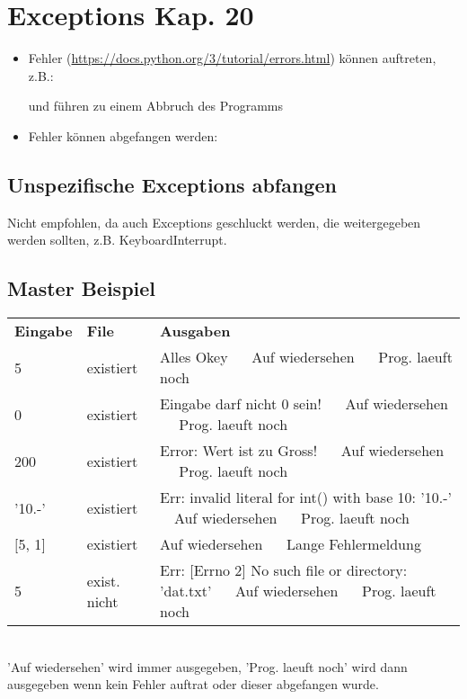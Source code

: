 \section[Exceptions]{Exceptions \tiny{Kap. 20}}
\begin{itemize}
	\item Fehler (\url{https://docs.python.org/3/tutorial/errors.html}) können auftreten, z.B.:
	
	und führen zu einem Abbruch des Programms
	\item Fehler können abgefangen werden:
	
\end{itemize}

\subsection{Unspezifische Exceptions abfangen}
Nicht empfohlen, da auch Exceptions geschluckt werden, die weitergegeben werden sollten, z.B. KeyboardInterrupt.\\


\subsection{Master Beispiel}

\begin{tabular}{lll}
	\textbf{Eingabe} & \textbf{File}  & \textbf{Ausgaben}\\
	5 		& existiert & Alles Okey $ \quad $ Auf wiedersehen $ \quad $ Prog. laeuft noch\\
	0 		& existiert & Eingabe darf nicht 0 sein! $ \quad $ Auf wiedersehen $ \quad $ Prog. laeuft noch\\
	200		& existiert & Error: Wert ist zu Gross! $ \quad $ Auf wiedersehen $ \quad $ Prog. laeuft noch\\
	'10.-' 	& existiert & Err: invalid literal for int() with base 10: '10.-' $ \quad $Auf wiedersehen $ \quad $ Prog. laeuft noch\\
	$[$5, 1$]$ 	& existiert & Auf wiedersehen $ \quad $ Lange Fehlermeldung\\ 
	5		& exist. nicht & Err: [Errno 2] No such file or directory: 'dat.txt' $ \quad $ Auf wiedersehen $ \quad $ Prog. laeuft noch
\end{tabular}\\[10pt]
'Auf wiedersehen' wird immer ausgegeben, 'Prog. laeuft noch' wird dann ausgegeben wenn kein Fehler auftrat oder dieser abgefangen wurde.

